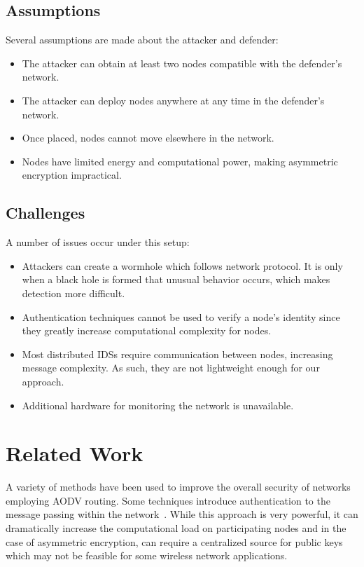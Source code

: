 \documentclass[12pt,a4paper]{report}
\begin{document}
\subsection{Assumptions}
Several assumptions are made about the attacker and defender:
\begin{itemize}
    \item The attacker can obtain at least two nodes compatible with the defender's network.
    \item The attacker can deploy nodes anywhere at any time in the defender's network.
    \item Once placed, nodes cannot move elsewhere in the network.
    \item Nodes have limited energy and computational power, making asymmetric encryption impractical.
\end{itemize}

\subsection{Challenges}
A number of issues occur under this setup:
\begin{itemize}
    \item Attackers can create a wormhole which follows network protocol. It is only when a black hole is formed that unusual behavior occurs, which makes detection more difficult.
    \item Authentication techniques cannot be used to verify a node's identity since they greatly increase computational complexity for nodes.
    \item Most distributed IDSs require communication between nodes, increasing message complexity. As such, they are not lightweight enough for our approach.
    \item Additional hardware for monitoring the network is unavailable.
\end{itemize}

\section{Related Work}
A variety of methods have been used to improve the overall security of networks employing AODV routing. Some techniques introduce authentication to the message passing within the network~\cite{Hu:2005:ASO:1160100.1160103, 1181388, 806983}. While this approach is very powerful, it can dramatically increase the computational load on participating nodes and in the case of asymmetric encryption, can require a centralized source for public keys which may not be feasible for some wireless network applications.
\end{document}

